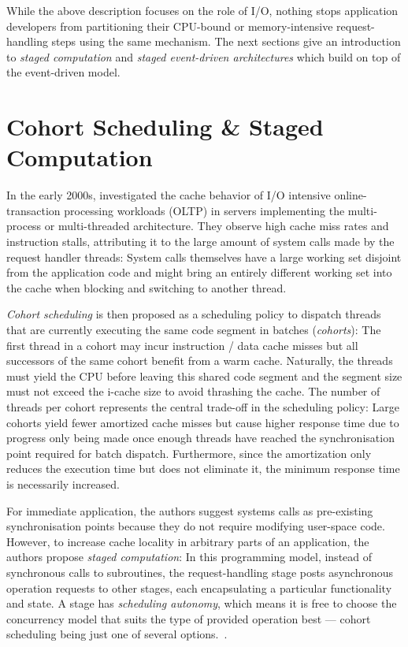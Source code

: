 \documentclass[12pt,a4paper]{book}
\begin{document}
While the above description focuses on the role of I/O, nothing stops application developers from partitioning their CPU-bound or memory-intensive request-handling steps using the same mechanism.
The next sections give an introduction to \emph{staged computation} and \emph{staged event-driven architectures} which build on top of the event-driven model.

\section{Cohort Scheduling \& Staged Computation}\label{ch:relwork:cohort}
In the early 2000s, \citeauthor*{cohort} investigated the cache behavior of I/O intensive online-transaction processing workloads (OLTP) in servers implementing the multi-process or multi-threaded architecture.
They observe high cache miss rates and instruction stalls, attributing it to the large amount of system calls made by the request handler threads:
System calls themselves have a large working set disjoint from the application code and might bring an entirely different working set into the cache when blocking and switching to another thread.~\cite{cohort}

\emph{Cohort scheduling} is then proposed as a scheduling policy to dispatch threads that are currently executing the same code segment in batches (\emph{cohorts}):
The first thread in a cohort may incur instruction / data cache misses but all successors of the same cohort benefit from a warm cache.
Naturally, the threads must yield the CPU before leaving this shared code segment and the segment size must not exceed the i-cache size to avoid thrashing the cache.
The number of threads per cohort represents the central trade-off in the scheduling policy:
Large cohorts yield fewer amortized cache misses but cause higher response time due to progress only being made once enough threads have reached the synchronisation point required for batch dispatch.
Furthermore, since the amortization only reduces the execution time but does not eliminate it, the minimum response time is necessarily increased.~\cite{cohort}

For immediate application, the authors suggest systems calls as pre-existing synchronisation points because they do not require modifying user-space code.
However, to increase cache locality in arbitrary parts of an application, the authors propose \emph{staged computation}:
In this programming model, instead of synchronous calls to subroutines, the request-handling stage posts asynchronous operation requests to other stages, each encapsulating a particular functionality and state.
A stage has \emph{scheduling autonomy}, which means it is free to choose the concurrency model that suits the type of provided operation best --- cohort scheduling being just one of several options.~\cite{cohort}.
\end{document}
